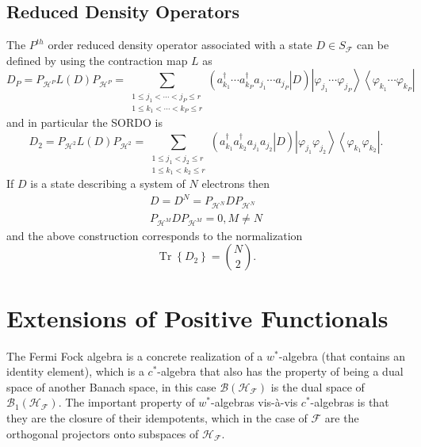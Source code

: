 \documentclass[aps,preprint]{revtex4}%
\begin{document}
\subsection{Reduced Density Operators \label{Reduced Density Operators}}

The $P^{th}$ order reduced density operator associated with a state $D\in
S_{\mathcal{F}}$ can be defined by using the contraction map $L$ as
\begin{equation}
D_{P}=P_{\mathcal{H}^{P}}L\left(  D\right)  P_{\mathcal{H}^{P}}=\sum
_{\substack{1\leq j_{1}<\cdots<j_{P}\leq r\\1\leq k_{1}<\cdots<k_{P}\leq
r}}\left(  \left.  a_{k_{1}}^{\dagger}\cdots a_{k_{P}}^{\dagger}a_{j_{1}%
}\cdots a_{j_{P}}\right\vert D\right)  \left\vert \varphi_{j_{1}}\cdots
\varphi_{j_{P}}\right\rangle \left\langle \varphi_{k_{1}}\cdots\varphi_{k_{P}%
}\right\vert \label{PORDO}%
\end{equation}
and in particular the SORDO is
\begin{equation}
D_{2}=P_{\mathcal{H}^{2}}L\left(  D\right)  P_{\mathcal{H}^{2}}=\sum
_{\substack{1\leq j_{1}<j_{2}\leq r\\1\leq k_{1}<k_{2}\leq r}}\left(  \left.
a_{k_{1}}^{\dagger}a_{k_{2}}^{\dagger}a_{j_{1}}a_{j_{2}}\right\vert D\right)
\left\vert \varphi_{j_{1}}\varphi_{j_{2}}\right\rangle \left\langle
\varphi_{k_{1}}\varphi_{k_{2}}\right\vert .
\end{equation}
If $D$ is a state describing a system of $N$ electrons then
\begin{gather}
D=D^{N}=P_{\mathcal{H}^{N}}DP_{\mathcal{H}^{N}}\nonumber\\
P_{\mathcal{H}^{M}}DP_{\mathcal{H}^{M}}=0,M\neq N
\end{gather}
and the above construction corresponds to the normalization
\begin{equation}
\operatorname*{Tr}\left\{  D_{2}\right\}  =\binom{N}{2}.
\end{equation}


\section{Extensions of Positive Functionals \label{Extensions}}

The Fermi Fock algebra is a concrete realization of a $w^{\ast}$-algebra
\cite{wstar} (that contains an identity element), which is a $c^{\ast}%
$-algebra that also has the property of being a dual space of another Banach
space, in this case $\mathcal{B}\left(  \mathcal{H}_{\mathcal{F}}\right)  $ is
the dual space of $\mathcal{B}_{1}\left(  \mathcal{H}_{\mathcal{F}}\right)  $.
The important property of $w^{\ast}$-algebras vis-\`{a}-vis $c^{\ast}%
$-algebras is that they are the closure of their idempotents, which in the
case of $\mathcal{F}$ are the orthogonal projectors onto subspaces of
$\mathcal{H}_{\mathcal{F}}.$
\end{document}
